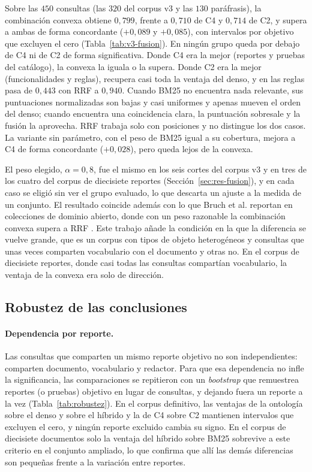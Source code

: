 \documentclass[11pt,letterpaper]{article}
\numberwithin{equation}{section}
\begin{document}
Sobre las $450$ consultas (las $320$ del corpus v3 y las $130$ paráfrasis), la combinación convexa obtiene $0{,}799$, frente a $0{,}710$ de C4 y $0{,}714$ de C2, y supera a ambas de forma concordante ($+0{,}089$ y $+0{,}085$), con intervalos por objetivo que excluyen el cero (Tabla~\ref{tab:v3-fusion}). En ningún grupo queda por debajo de C4 ni de C2 de forma significativa. Donde C4 era la mejor (reportes y pruebas del catálogo), la convexa la iguala o la supera. Donde C2 era la mejor (funcionalidades y reglas), recupera casi toda la ventaja del denso, y en las reglas pasa de $0{,}443$ con RRF a $0{,}940$. Cuando BM25 no encuentra nada relevante, sus puntuaciones normalizadas son bajas y casi uniformes y apenas mueven el orden del denso; cuando encuentra una coincidencia clara, la puntuación sobresale y la fusión la aprovecha. RRF trabaja solo con posiciones y no distingue los dos casos. La variante sin parámetro, con el peso de BM25 igual a su cobertura, mejora a C4 de forma concordante ($+0{,}028$), pero queda lejos de la convexa.

El peso elegido, $\alpha=0{,}8$, fue el mismo en los seis cortes del corpus v3 y en tres de los cuatro del corpus de diecisiete reportes (Sección~\ref{sec:res-fusion}), y en cada caso se eligió sin ver el grupo evaluado, lo que descarta un ajuste a la medida de un conjunto. El resultado coincide además con lo que Bruch et al. reportan en colecciones de dominio abierto, donde con un peso razonable la combinación convexa supera a RRF \cite{bruch2024fusion}. Este trabajo añade la condición en la que la diferencia se vuelve grande, que es un corpus con tipos de objeto heterogéneos y consultas que unas veces comparten vocabulario con el documento y otras no. En el corpus de diecisiete reportes, donde casi todas las consultas compartían vocabulario, la ventaja de la convexa era solo de dirección.


\subsection{Robustez de las conclusiones}
\label{sec:res-robustez}
\paragraph{Dependencia por reporte.} Las consultas que comparten un mismo reporte objetivo no son independientes: comparten documento, vocabulario y redactor. Para que esa dependencia no infle la significancia, las comparaciones se repitieron con un \textit{bootstrap} que remuestrea reportes (o pruebas) objetivo en lugar de consultas, y dejando fuera un reporte a la vez (Tabla~\ref{tab:robustez}). En el corpus definitivo, las ventajas de la ontología sobre el denso y sobre el híbrido y la de C4 sobre C2 mantienen intervalos que excluyen el cero, y ningún reporte excluido cambia su signo. En el corpus de diecisiete documentos solo la ventaja del híbrido sobre BM25 sobrevive a este criterio en el conjunto ampliado, lo que confirma que allí las demás diferencias son pequeñas frente a la variación entre reportes.
\end{document}

